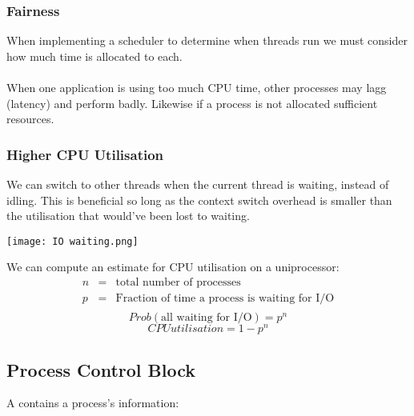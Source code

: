 \documentclass{report}
\begin{document}
\subsubsection*{Fairness}
When implementing a scheduler to determine when threads run we must consider how much time is allocated to each.
\\
\\ When one application is using too much CPU time, other processes may lagg (latency) and perform badly. Likewise if a process is not allocated sufficient resources.
\subsubsection*{Higher CPU Utilisation}
We can switch to other threads when the current thread is waiting, instead of idling. This is beneficial so long as the context switch overhead is smaller than the utilisation that would've been lost to waiting.
\begin{center}
	\texttt{[image: IO waiting.png]}
\end{center}
We can compute an estimate for CPU utilisation on a uniprocessor:
\[\begin{matrix}
		n & = & \text{total number of processes}                     \\
		p & = & \text{Fraction of time a process is waiting for I/O} \\
	\end{matrix}\]
\[Prob(\text{all waiting for I/O}) = p^n\]
\[CPU utilisation = 1- p^n\]
\subsection*{Process Control Block}
A  contains a process's information:
\begin{itemize}
\end{itemize}
\end{document}
